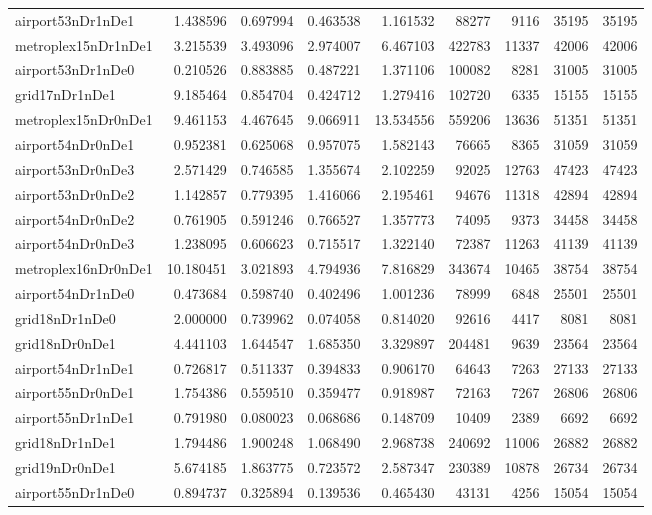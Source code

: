 \begin{longtable}{|l|r|r|r|r|r|r|r|r|}
airport53nDr1nDe1 & 1.438596 & 0.697994 & 0.463538 & 1.161532 & 88277 & 9116 & 35195 & 35195 \\
metroplex15nDr1nDe1 & 3.215539 & 3.493096 & 2.974007 & 6.467103 & 422783 & 11337 & 42006 & 42006 \\
airport53nDr1nDe0 & 0.210526 & 0.883885 & 0.487221 & 1.371106 & 100082 & 8281 & 31005 & 31005 \\
grid17nDr1nDe1 & 9.185464 & 0.854704 & 0.424712 & 1.279416 & 102720 & 6335 & 15155 & 15155 \\
metroplex15nDr0nDe1 & 9.461153 & 4.467645 & 9.066911 & 13.534556 & 559206 & 13636 & 51351 & 51351 \\
airport54nDr0nDe1 & 0.952381 & 0.625068 & 0.957075 & 1.582143 & 76665 & 8365 & 31059 & 31059 \\
airport53nDr0nDe3 & 2.571429 & 0.746585 & 1.355674 & 2.102259 & 92025 & 12763 & 47423 & 47423 \\
airport53nDr0nDe2 & 1.142857 & 0.779395 & 1.416066 & 2.195461 & 94676 & 11318 & 42894 & 42894 \\
airport54nDr0nDe2 & 0.761905 & 0.591246 & 0.766527 & 1.357773 & 74095 & 9373 & 34458 & 34458 \\
airport54nDr0nDe3 & 1.238095 & 0.606623 & 0.715517 & 1.322140 & 72387 & 11263 & 41139 & 41139 \\
metroplex16nDr0nDe1 & 10.180451 & 3.021893 & 4.794936 & 7.816829 & 343674 & 10465 & 38754 & 38754 \\
airport54nDr1nDe0 & 0.473684 & 0.598740 & 0.402496 & 1.001236 & 78999 & 6848 & 25501 & 25501 \\
grid18nDr1nDe0 & 2.000000 & 0.739962 & 0.074058 & 0.814020 & 92616 & 4417 & 8081 & 8081 \\
grid18nDr0nDe1 & 4.441103 & 1.644547 & 1.685350 & 3.329897 & 204481 & 9639 & 23564 & 23564 \\
airport54nDr1nDe1 & 0.726817 & 0.511337 & 0.394833 & 0.906170 & 64643 & 7263 & 27133 & 27133 \\
airport55nDr0nDe1 & 1.754386 & 0.559510 & 0.359477 & 0.918987 & 72163 & 7267 & 26806 & 26806 \\
airport55nDr1nDe1 & 0.791980 & 0.080023 & 0.068686 & 0.148709 & 10409 & 2389 & 6692 & 6692 \\
grid18nDr1nDe1 & 1.794486 & 1.900248 & 1.068490 & 2.968738 & 240692 & 11006 & 26882 & 26882 \\
grid19nDr0nDe1 & 5.674185 & 1.863775 & 0.723572 & 2.587347 & 230389 & 10878 & 26734 & 26734 \\
airport55nDr1nDe0 & 0.894737 & 0.325894 & 0.139536 & 0.465430 & 43131 & 4256 & 15054 & 15054 \\

\end{longtable}
